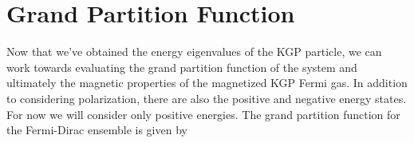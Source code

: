 \documentclass[
aps,
pra,
twocolumn,
showpacs,
preprintnumbers,
amsmath,
amssymb,
footinbib
]{revtex4-2}
\begin{document}
\section{Grand Partition Function}\label{sec:PARTsec}
\noindent Now that we've obtained the energy eigenvalues of the KGP particle, we can work towards evaluating the grand partition function of the system and ultimately the magnetic properties of the magnetized KGP Fermi gas. In addition to considering polarization, there are also the positive and negative energy states. For now we will consider only positive energies. The grand partition function for the Fermi-Dirac ensemble is given by
\end{document}
